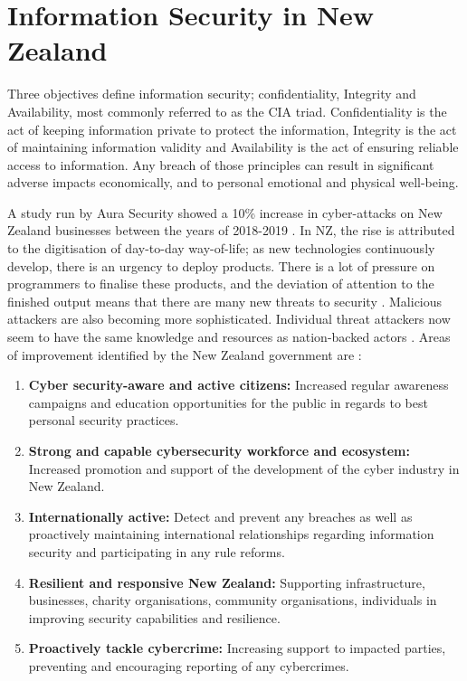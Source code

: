 \section{Information Security in New Zealand}

Three objectives define information security; confidentiality, Integrity and Availability, most commonly referred to as the CIA triad. Confidentiality is the act of keeping information private to protect the information, Integrity is the act of maintaining information validity and Availability is the act of ensuring reliable access to information.  Any breach of those principles can result in significant adverse impacts economically, and to personal emotional and physical well-being. 
\newline
\par A study run by Aura Security showed a 10\% increase in cyber-attacks on New Zealand businesses between the years of 2018-2019 \cite{aura}. In NZ, the rise is attributed to the digitisation of day-to-day way-of-life; as new technologies continuously develop, there is an urgency to deploy products. There is a lot of pressure on programmers to finalise these products, and the deviation of attention to the finished output means that there are many new threats to security \cite{securitystrat}. Malicious attackers are also becoming more sophisticated. Individual threat attackers now seem to have the same knowledge and resources as nation-backed actors \cite{securitystrat}.
\newline
\newline
Areas of improvement identified by the New Zealand government are \cite{securitystrat}:

\begin{enumerate}
    \item \textbf{Cyber security-aware and active citizens:} Increased regular awareness campaigns and education opportunities for the public in regards to best personal security practices. 
    \item \textbf{Strong and capable cybersecurity workforce and ecosystem:} Increased promotion and support of the development of the cyber industry in New Zealand.
    \item \textbf{Internationally active:} Detect and prevent any breaches as well as proactively maintaining international relationships regarding information security and participating in any rule reforms. 
    \item \textbf{Resilient and responsive New Zealand:} Supporting infrastructure, businesses, charity organisations, community organisations, individuals in improving security capabilities and resilience.
    \item \textbf{Proactively tackle cybercrime:} Increasing support to impacted parties,  preventing and encouraging reporting of any cybercrimes. 
\end{enumerate}

